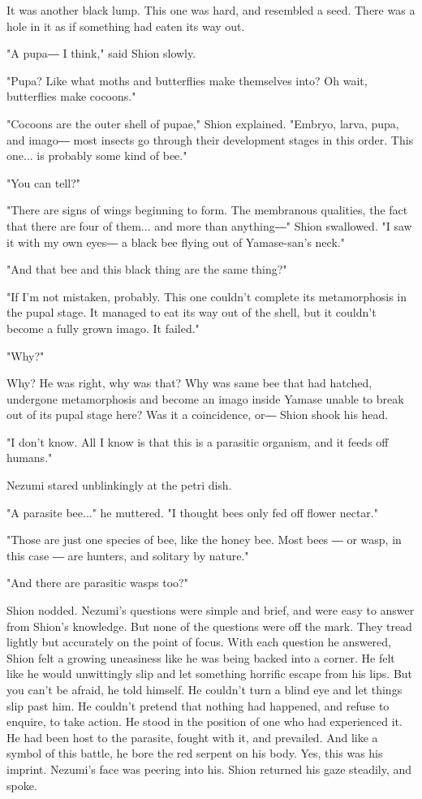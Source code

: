 It was another black lump. This one was hard, and resembled a seed.
There was a hole in it as if something had eaten its way out.

"A pupa― I think," said Shion slowly.

"Pupa? Like what moths and butterflies make themselves into? Oh wait,
butterflies make cocoons."

"Cocoons are the outer shell of pupae," Shion explained. "Embryo, larva,
pupa, and imago― most insects go through their development stages in
this order. This one... is probably some kind of bee."

"You can tell?"

"There are signs of wings beginning to form. The membranous qualities,
the fact that there are four of them... and more than anything―" Shion
swallowed. "I saw it with my own eyes― a black bee flying out of
Yamase-san's neck."

"And that bee and this black thing are the same thing?"

"If I'm not mistaken, probably. This one couldn't complete its
metamorphosis in the pupal stage. It managed to eat its way out of the
shell, but it couldn't become a fully grown imago. It failed."

"Why?"

Why? He was right, why was that? Why was same bee that had hatched,
undergone metamorphosis and become an imago inside Yamase unable to
break out of its pupal stage here? Was it a coincidence, or― Shion shook
his head.

"I don't know. All I know is that this is a parasitic organism, and it
feeds off humans."

Nezumi stared unblinkingly at the petri dish.

"A parasite bee..." he muttered. "I thought bees only fed off flower
nectar."

"Those are just one species of bee, like the honey bee. Most bees ― or
wasp, in this case ― are hunters, and solitary by nature."

"And there are parasitic wasps too?"

Shion nodded. Nezumi's questions were simple and brief, and were easy to
answer from Shion's knowledge. But none of the questions were off the
mark. They tread lightly but accurately on the point of focus. With each
question he answered, Shion felt a growing uneasiness like he was being
backed into a corner. He felt like he would unwittingly slip and let
something horrific escape from his lips. But you can't be afraid, he
told himself. He couldn't turn a blind eye and let things slip past him.
He couldn't pretend that nothing had happened, and refuse to enquire, to
take action. He stood in the position of one who had experienced it. He
had been host to the parasite, fought with it, and prevailed. And like a
symbol of this battle, he bore the red serpent on his body. Yes, this
was his imprint. Nezumi's face was peering into his. Shion returned his
gaze steadily, and spoke.

